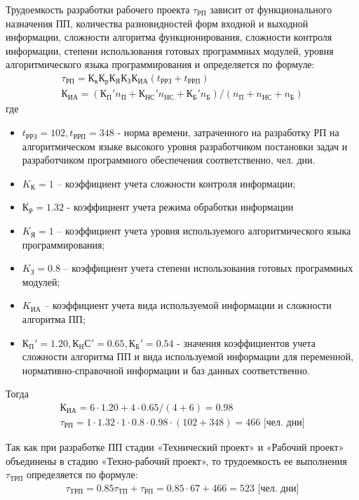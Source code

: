 Трудоемкость разработки рабочего проекта $\tau_{РП}$ зависит от
функционального назначения ПП, количества разновидностей форм входной
и выходной информации, сложности алгоритма функционирования,
сложности контроля информации, степени использования готовых
программных модулей, уровня алгоритмического языка программирования и
определяется по формуле:
\begin{gather*}
  \tau_{РП} = К_к К_р К_Я К_З К_{ИА} (t_{РРЗ} + t_{РРП})\\
  К_{ИА} = (К_П' n_П + К_{НС}' n_{НС} + К_Б' n_Б) / (n_П + n_{НС} + n_Б)
\end{gather*}
где
\begin{itemize}
  \item $t_{РРЗ} = 102, t_{РРП} = 348$ - норма времени, затраченного на разработку РП на алгоритмическом языке высокого уровня разработчиком постановки задач и разработчиком программного обеспечения соответственно, чел. дни.
  \item $K_К = 1$ – коэффициент учета сложности контроля информации;
  \item $К_Р = 1.32$ - коэффициент учета режима обработки информации
  \item $K_Я = 1$ – коэффициент учета уровня используемого алгоритмического языка программирования;
  \item $K_З = 0.8$ – коэффициент учета степени использования готовых программных модулей;
  \item $K_{ИА}$ – коэффициент учета вида используемой информации и сложности алгоритма ПП;
  \item $К_П' = 1.20, К_НС' = 0.65, К_Б' = 0.54$ - значения коэффициентов учета сложности алгоритма ПП и вида используемой информации для переменной, нормативно-справочной информации и баз данных соответственно.
\end{itemize}
Тогда
\begin{gather*}
  К_{ИА} = 6 \cdot 1.20 + 4 \cdot 0.65 / (4 + 6) = 0.98 \\
  \tau_{РП} = 1 \cdot 1.32 \cdot 1 \cdot 0.8 \cdot 0.98 \cdot(102 + 348) = 466 \text{ [чел. дни]}
\end{gather*}

Так как при разработке ПП стадии «Технический проект» и «Рабочий
проект» объединены в стадию «Техно-рабочий проект», то трудоемкость ее
выполнения $\tau_{ТРП}$ определяется по формуле:
\begin{gather*}
  \tau_{ТРП} = 0.85 \tau_{ТП} + \tau_{РП} = 0.85 \cdot 67 + 466 = 523 \text{ [чел. дни]}
\end{gather*}

